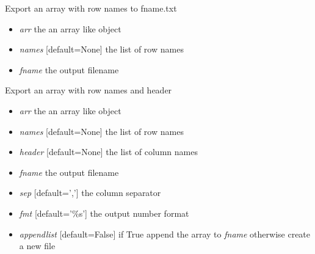 \documentclass[a4paper,11pt,english]{sphinxmanual}
\begin{document}
\begin{fulllineitems}
\label{modules_doc:cbmpy.CBTools.exportLabelledArray2TXT}
Export an array with row names to fname.txt
\begin{itemize}
\item {} 
\emph{arr} the an array like object

\item {} 
\emph{names} {[}default=None{]} the list of row names

\item {} 
\emph{fname} the output filename

\end{itemize}

\end{fulllineitems}


\begin{fulllineitems}
\label{modules_doc:cbmpy.CBTools.exportLabelledArrayWithHeader}
Export an array with row names and header
\begin{itemize}
\item {} 
\emph{arr} the an array like object

\item {} 
\emph{names} {[}default=None{]} the list of row names

\item {} 
\emph{header} {[}default=None{]} the list of column names

\item {} 
\emph{fname} the output filename

\item {} 
\emph{sep} {[}default=','{]} the column separator

\item {} 
\emph{fmt} {[}default='\%s'{]} the output number format

\item {} 
\emph{appendlist} {[}default=False{]} if True append the array to \emph{fname} otherwise create a new file

\end{itemize}

\end{fulllineitems}
\end{document}
